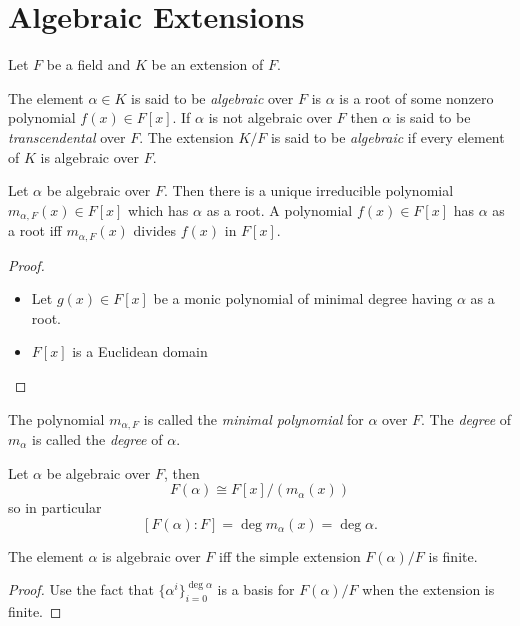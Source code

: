 \documentclass[a4paper]{article}
\begin{document}
\section{Algebraic Extensions}

Let $F$ be a field and $K$ be an extension of $F$.

\begin{defi}
  The element $\alpha\in K$ is said to be \emph{algebraic} over $F$ is $\alpha$ is a root of some nonzero polynomial $f(x)\in F[x]$. If $\alpha$ is not algebraic over $F$ then $\alpha$ is said to be \emph{transcendental} over $F$. The extension $K/F$ is said to be \emph{algebraic} if every element of $K$ is algebraic over $F$.
\end{defi}

\begin{prop}
  Let $\alpha$ be algebraic over $F$. Then there is a unique irreducible polynomial $m_{\alpha,F}(x)\in F[x]$ which has $\alpha$ as a root. A polynomial $f(x)\in F[x]$ has $\alpha$ as a root iff $m_{\alpha,F}(x)$ divides $f(x)$ in $F[x]$.
\end{prop}

\begin{proof}\leavevmode
  \begin{itemize}
  \item Let $g(x)\in F[x]$ be a monic polynomial of minimal degree having $\alpha$ as a root.
  \item $F[x]$ is a Euclidean domain
  \end{itemize}
\end{proof}

\begin{defi}
  The polynomial $m_{\alpha,F}$ is called the \emph{minimal polynomial} for $\alpha$ over $F$. The \emph{degree} of $m_\alpha$ is called the \emph{degree} of $\alpha$.
\end{defi}

\begin{prop}
  Let $\alpha$ be algebraic over $F$, then
  \[
    F(\alpha) \cong F[x]/(m_\alpha(x))
  \]
  so in particular
  \[
    [F(\alpha):F] = \deg m_\alpha(x) = \deg \alpha.
  \]
\end{prop}

\begin{prop}
  The element $\alpha$ is algebraic over $F$ iff the simple extension $F(\alpha)/F$ is finite.
\end{prop}

\begin{proof}
  Use the fact that $\{\alpha^i\}_{i=0}^{\deg \alpha}$ is a basis for $F(\alpha)/F$ when the extension is finite.
\end{proof}
\end{document}
